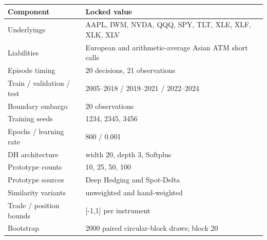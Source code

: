 \begin{tabular}{lp{}}
\toprule
Component & Locked value \\
\midrule
Underlyings & AAPL, IWM, NVDA, QQQ, SPY, TLT, XLE, XLF, XLK, XLV \\
Liabilities & European and arithmetic-average Asian ATM short calls \\
Episode timing & 20 decisions, 21 observations \\
Train / validation / test & 2005--2018 / 2019--2021 / 2022--2024 \\
Boundary embargo & 20 observations \\
Training seeds & 1234, 2345, 3456 \\
Epochs / learning rate & 800 / 0.001 \\
DH architecture & width 20, depth 3, Softplus \\
Prototype counts & 10, 25, 50, 100 \\
Prototype sources & Deep Hedging and Spot-Delta \\
Similarity variants & unweighted and hand-weighted \\
Trade / position bounds & [-1,1] per instrument \\
Bootstrap & 2000 paired circular-block draws; block 20 \\
\bottomrule
\end{tabular}
